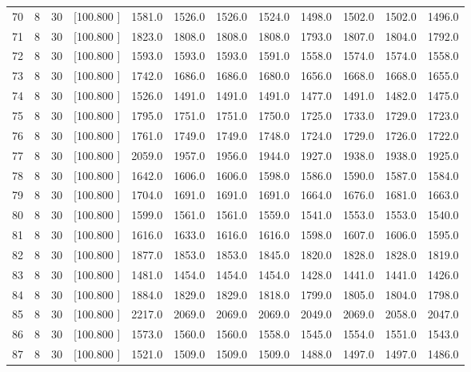 \documentclass[12pt,a4paper]{article}
\begin{document}
\begin{center}
{\begin{tabular}{r r r r r r r r r r r r}
  70&  8& 30&[100.800   ]&  1581.0&  1526.0&  1526.0&  1524.0&  1498.0&  1502.0&  1502.0&  1496.0\\[-0.02in]
  71&  8& 30&[100.800   ]&  1823.0&  1808.0&  1808.0&  1808.0&  1793.0&  1807.0&  1804.0&  1792.0\\[-0.02in]
  72&  8& 30&[100.800   ]&  1593.0&  1593.0&  1593.0&  1591.0&  1558.0&  1574.0&  1574.0&  1558.0\\[-0.02in]
  73&  8& 30&[100.800   ]&  1742.0&  1686.0&  1686.0&  1680.0&  1656.0&  1668.0&  1668.0&  1655.0\\[-0.02in]
  74&  8& 30&[100.800   ]&  1526.0&  1491.0&  1491.0&  1491.0&  1477.0&  1491.0&  1482.0&  1475.0\\[-0.02in]
  75&  8& 30&[100.800   ]&  1795.0&  1751.0&  1751.0&  1750.0&  1725.0&  1733.0&  1729.0&  1723.0\\[-0.02in]
  76&  8& 30&[100.800   ]&  1761.0&  1749.0&  1749.0&  1748.0&  1724.0&  1729.0&  1726.0&  1722.0\\[-0.02in]
  77&  8& 30&[100.800   ]&  2059.0&  1957.0&  1956.0&  1944.0&  1927.0&  1938.0&  1938.0&  1925.0\\[-0.02in]
  78&  8& 30&[100.800   ]&  1642.0&  1606.0&  1606.0&  1598.0&  1586.0&  1590.0&  1587.0&  1584.0\\[-0.02in]
  79&  8& 30&[100.800   ]&  1704.0&  1691.0&  1691.0&  1691.0&  1664.0&  1676.0&  1681.0&  1663.0\\[-0.02in]
  80&  8& 30&[100.800   ]&  1599.0&  1561.0&  1561.0&  1559.0&  1541.0&  1553.0&  1553.0&  1540.0\\[-0.02in]
  81&  8& 30&[100.800   ]&  1616.0&  1633.0&  1616.0&  1616.0&  1598.0&  1607.0&  1606.0&  1595.0\\[-0.02in]
  82&  8& 30&[100.800   ]&  1877.0&  1853.0&  1853.0&  1845.0&  1820.0&  1828.0&  1828.0&  1819.0\\[-0.02in]
  83&  8& 30&[100.800   ]&  1481.0&  1454.0&  1454.0&  1454.0&  1428.0&  1441.0&  1441.0&  1426.0\\[-0.02in]
  84&  8& 30&[100.800   ]&  1884.0&  1829.0&  1829.0&  1818.0&  1799.0&  1805.0&  1804.0&  1798.0\\[-0.02in]
  85&  8& 30&[100.800   ]&  2217.0&  2069.0&  2069.0&  2069.0&  2049.0&  2069.0&  2058.0&  2047.0\\[-0.02in]
  86&  8& 30&[100.800   ]&  1573.0&  1560.0&  1560.0&  1558.0&  1545.0&  1554.0&  1551.0&  1543.0\\[-0.02in]
  87&  8& 30&[100.800   ]&  1521.0&  1509.0&  1509.0&  1509.0&  1488.0&  1497.0&  1497.0&  1486.0\\[-0.02in]

\end{tabular}}
\end{center}
\end{document}
